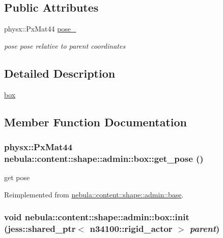 \subsection*{Public Attributes}
\begin{DoxyCompactItemize}
\item 
physx::PxMat44 \hyperlink{classnebula_1_1content_1_1shape_1_1admin_1_1box_a6365e7e95570a051c89eb187e1442c55}{pose\_\-}
\begin{DoxyCompactList}\small\item\em pose pose relative to parent coordinates \item\end{DoxyCompactList}\end{DoxyCompactItemize}


\subsection{Detailed Description}
\hyperlink{classnebula_1_1content_1_1shape_1_1admin_1_1box}{box} 

\subsection{Member Function Documentation}
\hypertarget{classnebula_1_1content_1_1shape_1_1admin_1_1box_a90262710172c5f4318565794f75939be}{
\subsubsection[{get\_\-pose}]{\setlength{\rightskip}{0pt plus 5cm}physx::PxMat44 nebula::content::shape::admin::box::get\_\-pose ()}}
\label{classnebula_1_1content_1_1shape_1_1admin_1_1box_a90262710172c5f4318565794f75939be}


get pose 

Reimplemented from \hyperlink{classnebula_1_1content_1_1shape_1_1admin_1_1base_a140ebc628fcc1ccad7363c866fbd6a4c}{nebula::content::shape::admin::base}.\hypertarget{classnebula_1_1content_1_1shape_1_1admin_1_1box_ade143fc2e0cf69ac51d898d4a2cb574d}{
\subsubsection[{init}]{\setlength{\rightskip}{0pt plus 5cm}void nebula::content::shape::admin::box::init (jess::shared\_\-ptr$<$ {\bf n34100::rigid\_\-actor} $>$ {\em parent})}}
\label{classnebula_1_1content_1_1shape_1_1admin_1_1box_ade143fc2e0cf69ac51d898d4a2cb574d}


